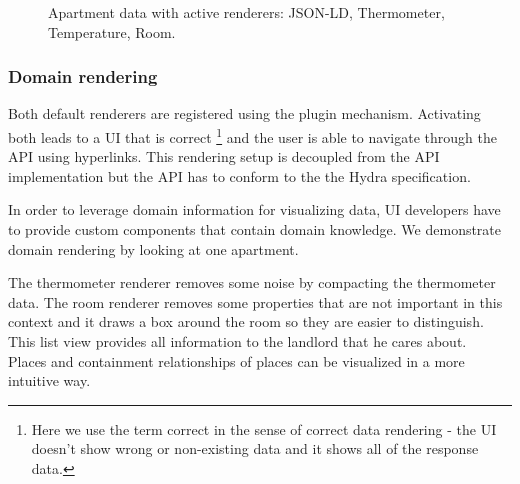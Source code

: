 \begin{figure}[!htb]
  \caption{Apartment data with active renderers: JSON-LD, Thermometer, Temperature, Room.}
  \label{fig:rooms}
\end{figure}

\subsubsection{Domain rendering}
Both default renderers are registered using the plugin mechanism. Activating both leads to a UI that is correct \footnote{Here we use the term correct in the sense of correct data rendering - the UI doesn't show wrong or non-existing data and it shows all of the response data.} and the user is able to navigate through the API using hyperlinks. This rendering setup is decoupled from the API implementation but the API has to conform to the the Hydra specification.

In order to leverage domain information for visualizing data, UI developers have to provide custom components that contain domain knowledge. We demonstrate domain rendering by looking at one apartment.

The thermometer renderer removes some noise by compacting the thermometer data. The room renderer removes some properties that are not important in this context and it draws a box around the room so they are easier to distinguish. This list view provides all information to the landlord that he cares about. \\
Places and containment relationships of places can be visualized in a more intuitive way.

